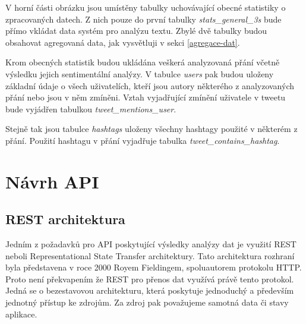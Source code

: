 \documentclass[thesis=B,czech]{FITthesis}[2012/06/26]
\begin{document}
V horní části obrázku jsou umístěny tabulky uchovávající obecné statistiky o zpracovaných datech. Z nich pouze do první tabulky \textit{stats\_general\_3s} bude přímo vkládat data systém pro analýzu textu. Zbylé dvě tabulky budou obsahovat agregovaná data, jak vysvětluji v sekci \ref{agregace-dat}. 

Krom obecných statistik budou ukládána veškerá analyzovaná přání včetně výsledku jejich sentimentální analýzy. V tabulce \textit{users} pak budou uloženy základní údaje o všech uživatelích, kteří jsou autory některého z analyzovaných přání nebo jsou v něm zmíněni. Vztah vyjadřující zmínění uživatele v tweetu bude vyjádřen tabulkou \textit{tweet\_mentions\_user}. 

Stejně tak jsou tabulce \textit{hashtags} uloženy všechny hashtagy použité v některém z přání. Použití hashtagu v přání vyjadřuje tabulka \textit{tweet\_contains\_hashtag}.

\section{Návrh API}
\label{rest}
\subsection{REST architektura}
	Jedním z požadavků pro API poskytující výsledky analýzy dat je využití REST neboli Representational State Transfer architektury. Tato architektura rozhraní byla představena v roce 2000 Royem Fieldingem, spoluautorem protokolu HTTP\cite{jjjlkll}. Proto není překvapením že REST pro přenos dat využívá právě tento protokol. Jedná se o bezestavovou architekturu, která poskytuje jednoduchý a především jednotný přístup ke zdrojům. Za zdroj pak považujeme samotná data či stavy aplikace. 
	
\end{document}
